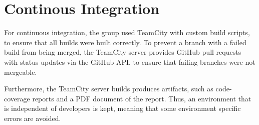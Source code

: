 \section{Continous Integration}
For continuous integration, the group used TeamCity with custom build scripts, to ensure that all builds were built correctly\cite{TeamCityHomepage}.
To prevent a branch with a failed build from being merged, the TeamCity server provides GitHub pull requests with status updates via the GitHub API, to ensure that failing branches were not mergeable.

Furthermore, the TeamCity server builds produces artifacts, such as code-coverage reports and a PDF document of the report.
Thus, an environment that is independent of developers is kept, meaning that some environment specific errors are avoided.
